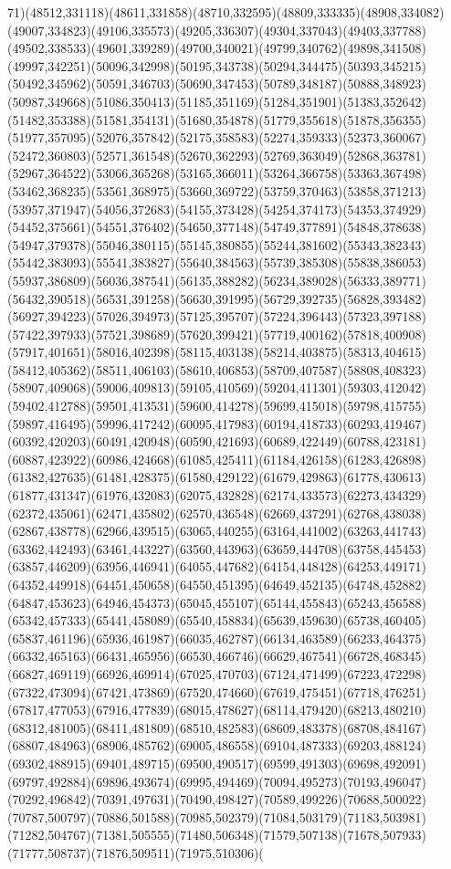 \documentclass[conference]{IEEEtran}
\begin{document}
71)(48512,331118)(48611,331858)(48710,332595)(48809,333335)(48908,334082)(49007,334823)(49106,335573)(49205,336307)(49304,337043)(49403,337788)(49502,338533)(49601,339289)(49700,340021)(49799,340762)(49898,341508)(49997,342251)(50096,342998)(50195,343738)(50294,344475)(50393,345215)(50492,345962)(50591,346703)(50690,347453)(50789,348187)(50888,348923)(50987,349668)(51086,350413)(51185,351169)(51284,351901)(51383,352642)(51482,353388)(51581,354131)(51680,354878)(51779,355618)(51878,356355)(51977,357095)(52076,357842)(52175,358583)(52274,359333)(52373,360067)(52472,360803)(52571,361548)(52670,362293)(52769,363049)(52868,363781)(52967,364522)(53066,365268)(53165,366011)(53264,366758)(53363,367498)(53462,368235)(53561,368975)(53660,369722)(53759,370463)(53858,371213)(53957,371947)(54056,372683)(54155,373428)(54254,374173)(54353,374929)(54452,375661)(54551,376402)(54650,377148)(54749,377891)(54848,378638)(54947,379378)(55046,380115)(55145,380855)(55244,381602)(55343,382343)(55442,383093)(55541,383827)(55640,384563)(55739,385308)(55838,386053)(55937,386809)(56036,387541)(56135,388282)(56234,389028)(56333,389771)(56432,390518)(56531,391258)(56630,391995)(56729,392735)(56828,393482)(56927,394223)(57026,394973)(57125,395707)(57224,396443)(57323,397188)(57422,397933)(57521,398689)(57620,399421)(57719,400162)(57818,400908)(57917,401651)(58016,402398)(58115,403138)(58214,403875)(58313,404615)(58412,405362)(58511,406103)(58610,406853)(58709,407587)(58808,408323)(58907,409068)(59006,409813)(59105,410569)(59204,411301)(59303,412042)(59402,412788)(59501,413531)(59600,414278)(59699,415018)(59798,415755)(59897,416495)(59996,417242)(60095,417983)(60194,418733)(60293,419467)(60392,420203)(60491,420948)(60590,421693)(60689,422449)(60788,423181)(60887,423922)(60986,424668)(61085,425411)(61184,426158)(61283,426898)(61382,427635)(61481,428375)(61580,429122)(61679,429863)(61778,430613)(61877,431347)(61976,432083)(62075,432828)(62174,433573)(62273,434329)(62372,435061)(62471,435802)(62570,436548)(62669,437291)(62768,438038)(62867,438778)(62966,439515)(63065,440255)(63164,441002)(63263,441743)(63362,442493)(63461,443227)(63560,443963)(63659,444708)(63758,445453)(63857,446209)(63956,446941)(64055,447682)(64154,448428)(64253,449171)(64352,449918)(64451,450658)(64550,451395)(64649,452135)(64748,452882)(64847,453623)(64946,454373)(65045,455107)(65144,455843)(65243,456588)(65342,457333)(65441,458089)(65540,458834)(65639,459630)(65738,460405)(65837,461196)(65936,461987)(66035,462787)(66134,463589)(66233,464375)(66332,465163)(66431,465956)(66530,466746)(66629,467541)(66728,468345)(66827,469119)(66926,469914)(67025,470703)(67124,471499)(67223,472298)(67322,473094)(67421,473869)(67520,474660)(67619,475451)(67718,476251)(67817,477053)(67916,477839)(68015,478627)(68114,479420)(68213,480210)(68312,481005)(68411,481809)(68510,482583)(68609,483378)(68708,484167)(68807,484963)(68906,485762)(69005,486558)(69104,487333)(69203,488124)(69302,488915)(69401,489715)(69500,490517)(69599,491303)(69698,492091)(69797,492884)(69896,493674)(69995,494469)(70094,495273)(70193,496047)(70292,496842)(70391,497631)(70490,498427)(70589,499226)(70688,500022)(70787,500797)(70886,501588)(70985,502379)(71084,503179)(71183,503981)(71282,504767)(71381,505555)(71480,506348)(71579,507138)(71678,507933)(71777,508737)(71876,509511)(71975,510306)(
\end{document}
